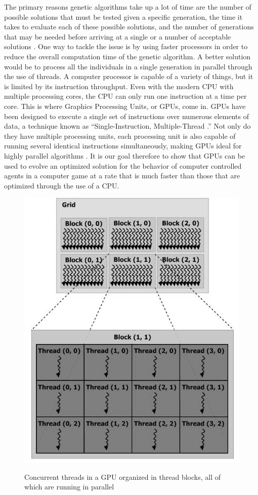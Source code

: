 \documentclass{acm_proc_article-sp}
\begin{document}
The primary reasons genetic algorithms take up a lot of time are the number of 
possible solutions that must be tested given a specific generation, the time it 
takes to evaluate each of these possible solutions, and the number of generations 
that may be needed before arriving at a single or a number of acceptable solutions \cite{Schwab04}. 
One way to tackle the issue is by using faster processors in order to reduce the
overall computation time of the genetic algorithm. A better solution would
be to process all the individuals in a single generation in parallel through the
use of threads. A computer processor is capable of a variety of things, but it is limited by its instruction throughput. Even with the modern CPU with multiple processing cores, the CPU can only
run one instruction at a time per core. This is where Graphics Processing Units, or GPUs, come in.
GPUs have been designed to execute a single set of instructions over numerous elements
of data, a technique known as ``Single-Instruction, Multiple-Thread \cite{pdf:NVCudaPrgGuide}.''
Not only do they have multiple processing units, each processing unit is also
capable of running several identical instructions simultaneously, making GPUs ideal
for highly parallel algorithms \cite{pdf:NVCudaPrgGuide}. It is our goal therefore to
show that GPUs can be used to evolve an optimized solution for the behavior of computer
controlled agents in a computer game at a rate that is much faster than those that are optimized
through the use of a CPU.

\begin{figure}
	\centering
		\graphicspath{{images/}}
		\includegraphics[width=190 pt]{gpu.jpg}
	\caption{Concurrent threads in a GPU organized in thread blocks, all of which
are running in parallel}
	\cite{pdf:NVCudaPrgGuide}
	\label{fig:gpu_diagram}
\end{figure}
\end{document}
